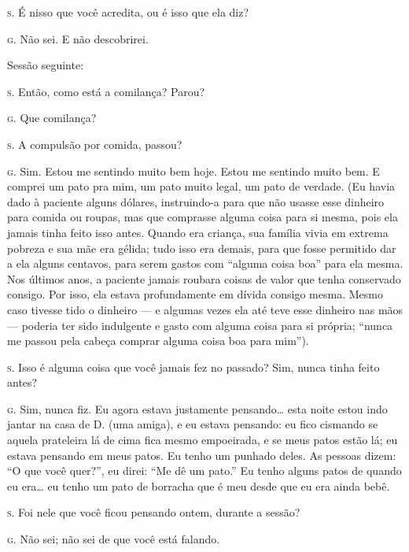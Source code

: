 \noindent\hskip0mm\textsc{s.} É nisso que você acredita, ou é isso que ela diz?

\noindent\hskip0mm\textsc{g.} Não sei. E não descobrirei.


\bigskip

Sessão seguinte:

\bigskip

\noindent\hskip0mm\textsc{s.} Então, como está a comilança? Parou?

\noindent\hskip0mm\textsc{g.} Que comilança?

\noindent\hskip0mm\textsc{s.} A compulsão por comida, passou?

\noindent\hskip0mm\textsc{g.} Sim. Estou me sentindo muito bem hoje. Estou me sentindo muito bem.
E comprei um pato pra mim, um pato muito legal, um pato de verdade.
(Eu havia dado à paciente alguns dólares, instruindo-a para que não
usasse esse dinheiro para comida ou roupas, mas que comprasse alguma
coisa para si mesma, pois ela jamais tinha feito isso antes. Quando era
criança, sua família vivia em extrema pobreza e sua mãe era gélida;
tudo isso era demais, para que fosse permitido dar a ela alguns
centavos, para serem gastos com ``alguma coisa
boa'' para ela mesma. Nos últimos anos, a paciente jamais
roubara coisas de valor que tenha conservado consigo. Por isso, ela
estava profundamente em dívida consigo mesma. Mesmo caso tivesse tido o
dinheiro --- e algumas vezes ela até teve esse dinheiro nas mãos ---
poderia ter sido indulgente e gasto com alguma coisa para si própria;
``nunca me passou pela cabeça comprar alguma coisa boa
para mim'').

\noindent\hskip0mm\textsc{s.} Isso é alguma coisa que você jamais fez no passado? Sim, nunca tinha
feito antes?

\noindent\hskip0mm\textsc{g.} Sim, nunca fiz. Eu agora estava justamente pensando\ldots{} esta noite
estou indo jantar na casa de D. (uma amiga), e eu estava pensando: eu
fico cismando se aquela prateleira lá de cima fica mesmo empoeirada, e
se meus patos estão lá; eu estava pensando em meus patos. Eu tenho um
punhado deles. As pessoas dizem: ``O que você
quer?'', eu direi: ``Me dê um
pato.'' Eu tenho alguns patos de quando eu era\ldots{} eu tenho
um pato de borracha que é meu desde que eu era ainda bebê.

\noindent\hskip0mm\textsc{s.} Foi nele que você ficou pensando ontem, durante a sessão?

\noindent\hskip0mm\textsc{g.} Não sei; não sei de que você está falando.

